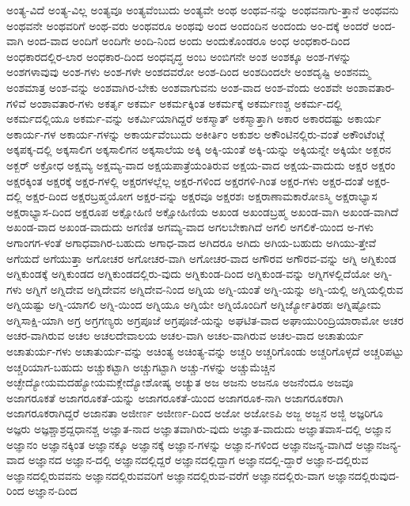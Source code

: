 {ಅಂತ್ಯ-ವಿದೆ
ಅಂತ್ಯ-ವಿಲ್ಲ
ಅಂತ್ಯವೂ
ಅಂತ್ಯವೆಂಬುದು
ಅಂತ್ಯವೇ
ಅಂಥ
ಅಂಥವ-ನನ್ನು
ಅಂಥವನಾಗು-ತ್ತಾನೆ
ಅಂಥವನು
ಅಂಥವನೇ
ಅಂಥವರಿಗೆ
ಅಂಥ-ವರು
ಅಂಥವರೂ
ಅಂಥವು
ಅಂದ
ಅಂದಂದಿನ
ಅಂದಂದು
ಅಂ-ದಕ್ಕೆ
ಅಂದರೆ
ಅಂದ-ವಾಗಿ
ಅಂದ-ವಾದ
ಅಂದಿಗೆ
ಅಂದಿಗೇ
ಅಂದಿ-ನಿಂದ
ಅಂದು
ಅಂದುಕೊಂಡರೂ
ಅಂಧ
ಅಂಧಕಾರ-ದಿಂದ
ಅಂಧಕಾರದಲ್ಲಿರ-ಲಾರ
ಅಂಧಕಾರ-ದಿಂದ
ಅಂಧವೃದ್ಧ
ಅಂಬ
ಅಂಬಿಗನೇ
ಅಂಶ
ಅಂಶಕ್ಕೂ
ಅಂಶ-ಗಳನ್ನು
ಅಂಶಗಳಾವುವು
ಅಂಶ-ಗಳು
ಅಂಶ-ಗಳೇ
ಅಂಶದವರೋ
ಅಂಶ-ದಿಂದ
ಅಂಶದಿಂದಲೇ
ಅಂಶದೃಷ್ಟಿ
ಅಂಶನಮ್ಮ
ಅಂಶಮಾತ್ರ
ಅಂಶ-ವನ್ನು
ಅಂಶವಾಗಿರ-ಬೇಕು
ಅಂಶವಾಗುವನು
ಅಂಶ-ವಾದ
ಅಂಶ-ವೆಂದು
ಅಂಶವೇ
ಅಂಶಾವತಾರ-ಗಳಿವೆ
ಅಂಶಾವತಾರ-ಗಳು
ಅಕರ್ತೃ
ಅಕರ್ಮ
ಅಕರ್ಮಕ್ಕಿಂತ
ಅಕರ್ಮಕ್ಕೆ
ಅಕರ್ಮಣಶ್ಚ
ಅಕರ್ಮ-ದಲ್ಲಿ
ಅಕರ್ಮದಲ್ಲಿಯೂ
ಅಕರ್ಮ-ವನ್ನು
ಅಕರ್ಮಿಯಾಗಿದ್ದರೆ
ಅಕಸ್ಮಾತ್
ಅಕಸ್ಮಾತ್ತಾಗಿ
ಅಕಾರ
ಅಕಾರದಷ್ಟು
ಅಕಾರ್ಯ
ಅಕಾರ್ಯ-ಗಳ
ಅಕಾರ್ಯ-ಗಳನ್ನು
ಅಕಾರ್ಯವೆಂಬುದು
ಅಕೀರ್ತಿಂ
ಅಕುಶಲ
ಅಕೌಂಟಿನಲ್ಲಿರು-ವಂತೆ
ಅಕೌಂಟೆಂಟ್ಗೆ
ಅಕ್ಕಪಕ್ಕ-ದಲ್ಲಿ
ಅಕ್ಕಸಾಲಿಗ
ಅಕ್ಕಸಾಲಿಗನ
ಅಕ್ಕಸಾಲೆಯ
ಅಕ್ಕಿ
ಅಕ್ಕಿ-ಯಂತೆ
ಅಕ್ಕಿ-ಯನ್ನು
ಅಕ್ಕಿಯನ್ನೇ
ಅಕ್ಕಿಯೇ
ಅಕ್ಬರನ
ಅಕ್ಬರ್
ಅಕ್ರೋಧ
ಅಕ್ಷಮ್ಯ
ಅಕ್ಷಮ್ಯ-ವಾದ
ಅಕ್ಷಯಪಾತ್ರೆಯಂತಿರುವ
ಅಕ್ಷಯ-ವಾದ
ಅಕ್ಷಯ-ವಾದುದು
ಅಕ್ಷರ
ಅಕ್ಷರಂ
ಅಕ್ಷರಕ್ಕಿಂತ
ಅಕ್ಷರಕ್ಕೆ
ಅಕ್ಷರ-ಗಳಲ್ಲಿ
ಅಕ್ಷರಗಳಲ್ಲೆಲ್ಲ
ಅಕ್ಷರ-ಗಳಿಂದ
ಅಕ್ಷರಗಳಿ-ಗಿಂತ
ಅಕ್ಷರ-ಗಳು
ಅಕ್ಷರ-ದಂತೆ
ಅಕ್ಷರ-ದಲ್ಲಿ
ಅಕ್ಷರ-ದಿಂದ
ಅಕ್ಷರಬ್ರಹ್ಮಯೋಗ
ಅಕ್ಷರ-ವನ್ನು
ಅಕ್ಷರವೂ
ಅಕ್ಷರಶಃ
ಅಕ್ಷರಾಣಾಮಕಾರೋಽಸ್ಮಿ
ಅಕ್ಷರಾಭ್ಯಾಸ
ಅಕ್ಷರಾಭ್ಯಾಸ-ದಿಂದ
ಅಕ್ಷರೂಪ
ಅಕ್ಷೋಹಿಣಿ
ಅಕ್ಷೋಹಿಣಿಯ
ಅಖಂಡ
ಅಖಂಡಬ್ರಹ್ಮ
ಅಖಂಡ-ವಾಗಿ
ಅಖಂಡ-ವಾಗಿದೆ
ಅಖಂಡ-ವಾದ
ಅಖಂಡ-ವಾದುದು
ಅಗಣಿತ
ಅಗಮ್ಯ-ವಾದ
ಅಗಲಬೇಕಾಗಿದೆ
ಅಗಲಿ
ಅಗಲಿಕೆ-ಯಿಂದ
ಅ-ಗಳು
ಅಗಾಂಗಗ-ಳಂತೆ
ಅಗಾಧವಾಗಿರ-ಬಹುದು
ಅಗಾಧ-ವಾದ
ಅಗಿದರೂ
ಅಗಿದು
ಅಗಿಯ-ಬಹುದು
ಅಗಿಯು-ತ್ತೇವೆ
ಅಗೆಯದೆ
ಅಗೆಯುತ್ತಾ
ಅಗೋಚರ
ಅಗೋಚರ-ವಾಗಿ
ಅಗೋಚರ-ವಾದ
ಅಗೌರವ
ಅಗೌರವ-ವನ್ನು
ಅಗ್ನಿ
ಅಗ್ನಿಕುಂಡ
ಅಗ್ನಿಕುಂಡಕ್ಕೆ
ಅಗ್ನಿಕುಂಡದ
ಅಗ್ನಿಕುಂಡದಲ್ಲಿರು-ವುದು
ಅಗ್ನಿಕುಂಡ-ದಿಂದ
ಅಗ್ನಿಕುಂಡ-ವನ್ನು
ಅಗ್ನಿಗಳಲ್ಲಿದೆಯೋ
ಅಗ್ನಿ-ಗಳು
ಅಗ್ನಿಗೆ
ಅಗ್ನಿದೇವ
ಅಗ್ನಿದೇವನ
ಅಗ್ನಿದೇವ-ನಿಂದ
ಅಗ್ನಿಯ
ಅಗ್ನಿ-ಯಂತೆ
ಅಗ್ನಿ-ಯನ್ನು
ಅಗ್ನಿ-ಯಲ್ಲಿ
ಅಗ್ನಿಯಲ್ಲಿರುವ
ಅಗ್ನಿಯಷ್ಟು
ಅಗ್ನಿ-ಯಾಗಲಿ
ಅಗ್ನಿ-ಯಿಂದ
ಅಗ್ನಿಯೂ
ಅಗ್ನಿಯೇ
ಅಗ್ನಿಯೊಂದಿಗೆ
ಅಗ್ನಿರ್ಜ್ಯೋತಿರಹಃ
ಅಗ್ನಿಷ್ಟೋಮ
ಅಗ್ನಿಸಾಕ್ಷಿ-ಯಾಗಿ
ಅಗ್ರ
ಅಗ್ರಗಣ್ಯರು
ಅಗ್ರಪೂಜೆ
ಅಗ್ರಪೂಜೆ-ಯನ್ನು
ಅಘಟಿತ-ವಾದ
ಅಘಾಯುರಿಂದ್ರಿಯಾರಾಮೋ
ಅಚರ
ಅಚರ-ವಾಗಿರುವ
ಅಚಲ
ಅಚಲದೇವಾಲಯ
ಅಚಲ-ವಾಗಿ
ಅಚಲ-ವಾಗಿರುವ
ಅಚಲ-ವಾದ
ಅಚಾತುರ್ಯ
ಅಚಾತುರ್ಯ-ಗಳು
ಅಚಾತುರ್ಯ-ವನ್ನು
ಅಚಿಂತ್ಯ
ಅಚಿಂತ್ಯ-ವನ್ನು
ಅಚ್ಚರಿ
ಅಚ್ಚರಿಗೊಂಡು
ಅಚ್ಚರಿಗೊಳ್ಳದೆ
ಅಚ್ಚರಿಪಟ್ಟು
ಅಚ್ಚರಿಯಾಗ-ಬಹುದು
ಅಚ್ಚುಕಟ್ಟಾಗಿ
ಅಚ್ಚುಗಟ್ಟಾಗಿ
ಅಚ್ಚು-ಗಳನ್ನು
ಅಚ್ಚುಮೆಚ್ಚಿನ
ಅಚ್ಛೇದ್ಯೋಯಮದಹ್ಯೋಯಮಕ್ಲೇದ್ಯೋಶೋಷ್ಯ
ಅಚ್ಯುತ
ಅಜ
ಅಜನು
ಅಜನೂ
ಅಜನೆಂದೂ
ಅಜವೂ
ಅಜಾಗರೂಕತೆ
ಅಜಾಗರೂಕತೆ-ಯನ್ನು
ಅಜಾಗರೂಕತೆ-ಯಿಂದ
ಅಜಾಗರೂಕ-ನಾಗಿ
ಅಜಾಗರೂಕರಾಗಿ
ಅಜಾಗರೂಕರಾಗಿದ್ದರೆ
ಅಜಾನತಾ
ಅಜೀರ್ಣ
ಅಜೀರ್ಣ-ದಿಂದ
ಅಜೋ
ಅಜೋಽಪಿ
ಅಜ್ಜ
ಅಜ್ಜನ
ಅಜ್ಜಿ
ಅಜ್ಞರಿಗೂ
ಅಜ್ಞರು
ಅಜ್ಞಶ್ಚಾಶ್ರದ್ದಧಾನಶ್ಚ
ಅಜ್ಞಾತ-ನಾದ
ಅಜ್ಞಾತವಾಗಿರು-ವುದು
ಅಜ್ಞಾತ-ವಾದುದು
ಅಜ್ಞಾತವಾಸ-ದಲ್ಲಿ
ಅಜ್ಞಾನ
ಅಜ್ಞಾನಂ
ಅಜ್ಞಾನಕ್ಕಿಂತ
ಅಜ್ಞಾನಕ್ಕೂ
ಅಜ್ಞಾನಕ್ಕೆ
ಅಜ್ಞಾನ-ಗಳನ್ನು
ಅಜ್ಞಾನ-ಗಳಿಂದ
ಅಜ್ಞಾನಜನ್ಯ-ವಾಗಿದೆ
ಅಜ್ಞಾನಜನ್ಯ-ವಾದ
ಅಜ್ಞಾನದ
ಅಜ್ಞಾನ-ದಲ್ಲಿ
ಅಜ್ಞಾನದಲ್ಲಿದ್ದರೆ
ಅಜ್ಞಾನದಲ್ಲಿದ್ದಾಗ
ಅಜ್ಞಾನದಲ್ಲಿ-ದ್ದಾರೆ
ಅಜ್ಞಾನ-ದಲ್ಲಿರುವ
ಅಜ್ಞಾನದಲ್ಲಿರುವವನು
ಅಜ್ಞಾನದಲ್ಲಿರುವವರಿಗೆ
ಅಜ್ಞಾನದಲ್ಲಿರುವ-ವರೆಗೆ
ಅಜ್ಞಾನದಲ್ಲಿರು-ವಾಗ
ಅಜ್ಞಾನದಲ್ಲಿರುವುದ-ರಿಂದ
ಅಜ್ಞಾನ-ದಿಂದ
}

